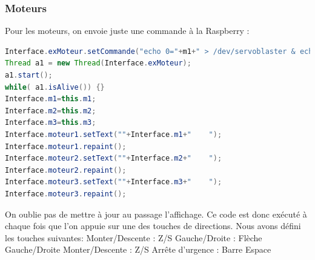 \documentclass[a4paper,11pt]{report}
\begin{document}
		\subsubsection{Moteurs}
		Pour les moteurs, on envoie juste une commande à la Raspberry :
		\begin{lstlisting}[language=java]
Interface.exMoteur.setCommande("echo 0="+m1+" > /dev/servoblaster & echo 1="+m2+" > /dev/servoblaster & echo 2="+m3+" > /dev/servoblaster");
Thread a1 = new Thread(Interface.exMoteur);
a1.start();
while( a1.isAlive()) {}
Interface.m1=this.m1;
Interface.m2=this.m2;
Interface.m3=this.m3;
Interface.moteur1.setText(""+Interface.m1+"    ");
Interface.moteur1.repaint();
Interface.moteur2.setText(""+Interface.m2+"    ");
Interface.moteur2.repaint();
Interface.moteur3.setText(""+Interface.m3+"    ");
Interface.moteur3.repaint();
		\end{lstlisting}
		On oublie pas de mettre à jour au passage l'affichage.
		\newline Ce code est donc exécuté à chaque fois que l'on appuie sur une des touches de directions.
		\newline Nous avons défini les touches suivantes:
		\newline Monter/Descente : Z/S
		\newline Gauche/Droite : Flèche Gauche/Droite
		\newline Monter/Descente : Z/S
		\newline Arrête d'urgence : Barre Espace
		
\end{document}
